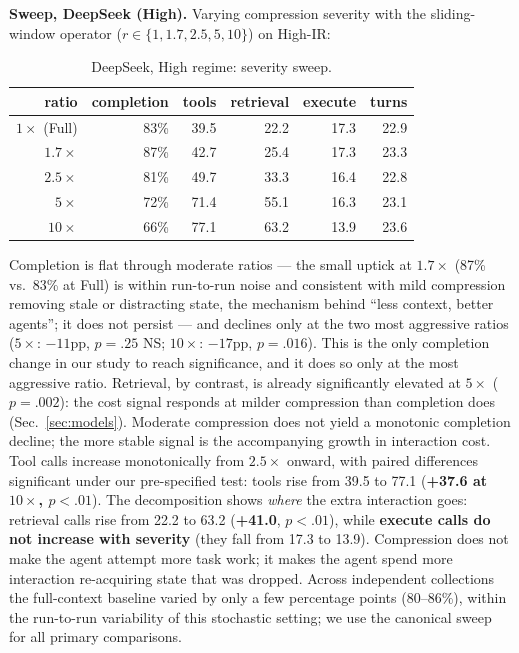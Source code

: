 \documentclass[11pt]{article}
\begin{document}
\textbf{Sweep, DeepSeek (High).} Varying compression severity with the sliding-window operator
($r \in \{1, 1.7, 2.5, 5, 10\}$) on High-IR:

\begin{table}[t]
\centering
\small
\caption{DeepSeek, High regime: severity sweep.}
\label{tab:sweep}
\begin{tabular}{@{}rrrrrr@{}}
\toprule
ratio & completion & tools & retrieval & execute & turns \\
\midrule
$1\times$ (Full) & 83\% & 39.5 & 22.2 & 17.3 & 22.9 \\
$1.7\times$ & 87\% & 42.7 & 25.4 & 17.3 & 23.3 \\
$2.5\times$ & 81\% & 49.7 & 33.3 & 16.4 & 22.8 \\
$5\times$ & 72\% & 71.4 & 55.1 & 16.3 & 23.1 \\
$10\times$ & 66\% & 77.1 & 63.2 & 13.9 & 23.6 \\
\bottomrule
\end{tabular}
\end{table}

Completion is flat through moderate ratios --- the small uptick at $1.7\times$ (87\% vs.\ 83\% at
Full) is within run-to-run noise and consistent with mild compression removing stale or
distracting state, the mechanism behind ``less context, better agents''; it does not
persist --- and declines only at the two most aggressive ratios ($5\times$: $-11$pp, $p = .25$ NS;
$10\times$: $-17$pp, \textbf{$p = .016$}). This is the only completion change in our study to reach
significance, and it does so only at the most aggressive ratio. Retrieval, by contrast,
is already significantly elevated at $5\times$ ($p = .002$): the cost signal responds at milder
compression than completion does (Sec.~\ref{sec:models}). Moderate compression does not yield a monotonic
completion decline; the more stable signal is the accompanying growth in interaction
cost. Tool calls increase
monotonically from $2.5\times$ onward, with paired differences significant under our
pre-specified test: tools rise from 39.5 to 77.1 (\textbf{+37.6 at $10\times$, $p < .01$}). The
decomposition shows \emph{where} the extra interaction goes: retrieval calls rise from 22.2 to
63.2 (\textbf{+41.0}, $p < .01$), while \textbf{execute calls do not increase with severity} (they
fall from 17.3 to 13.9). Compression does not make the agent attempt more task work; it
makes the agent spend more interaction re-acquiring state that was dropped. Across
independent collections
the full-context baseline varied by only a few percentage points (80--86\%), within the
run-to-run variability of this stochastic setting; we use the canonical sweep for all
primary comparisons.
\end{document}
